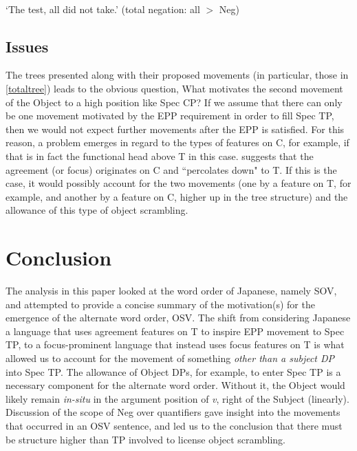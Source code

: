 \documentclass{article}
\begin{document}
\begin{exe}
    \ex
    \label{totaltree}
\\
`The test, all did not take.' (total negation: all $>$ Neg)
\end{exe}

\subsection{Issues}
\label{issues}
The trees presented along with their proposed movements (in particular, those in \ref{totaltree}) leads to the obvious question, What motivates the second movement of the Object to a high position like Spec CP? If we assume that there can only be one movement motivated by the EPP requirement in order to fill Spec TP, then we would not expect further movements after the EPP is satisfied. For this reason, a problem emerges in regard to the types of features on C, for example, if that is in fact the functional head above T in this case. \cite{Miyagawa2005} suggests that the agreement (or focus) originates on C and ``percolates down" to T. If this is the case, it would possibly account for the two movements (one by a feature on T, for example, and another by a feature on C, higher up in the tree structure) and the allowance of this type of object scrambling.

\section{Conclusion}
\label{conclusion}
The analysis in this paper looked at the word order of Japanese, namely SOV, and attempted to provide a concise summary of the motivation(s) for the emergence of the alternate word order, OSV. The shift from considering Japanese a language that uses agreement features on T to inspire EPP movement to Spec TP, to a focus-prominent language that instead uses focus features on T is what allowed us to account for the movement of something \textit{other than a subject DP} into Spec TP. The allowance of Object DPs, for example, to enter Spec TP is a necessary component for the alternate word order. Without it, the Object would likely remain \textit{in-situ} in the argument position of \textit{v}, right of the Subject (linearly). Discussion of the scope of Neg over quantifiers gave insight into the movements that occurred in an OSV sentence, and led us to the conclusion that there must be structure higher than TP involved to license object scrambling.



\end{document}
